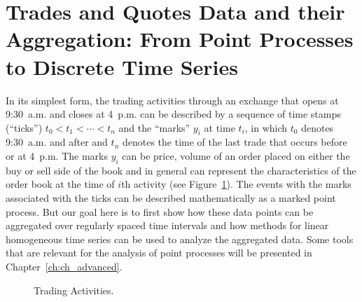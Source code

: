 \section{Trades and Quotes Data and their Aggregation: From Point Processes to Discrete Time Series\label{sec:tradesandquotes}}

In its simplest form, the trading activities through an exchange that opens at 9:30~a.m. and closes at 4~p.m. can be described by a sequence of time stamps (``ticks'') $t_0 < t_1 < \cdots < t_n$ and the ``marks'' $y_i$ at time $t_i$, in which $t_0$ denotes 9:30~a.m. and after and $t_n$ denotes the time of the last trade that occurs before or at 4~p.m. The marks $y_i$ can be price, volume of an order placed on either the buy or sell side of the book and in general can represent the characteristics of the order book at the time of $i$th activity (see Figure~\ref{fig:tradeactline}). The events with the marks associated with the ticks can be described mathematically as a marked point process. But our goal here is to first show how these data points can be aggregated over regularly spaced time intervals and how methods for linear homogeneous time series can be used to analyze the aggregated data. Some tools that are relevant for the analysis of point processes will be presented in Chapter~\ref{ch:ch_advanced}. \label{in:disc_time_unit1} \label{in:level3dat2}
	\begin{figure}[!ht]
	\centering
	\caption{Trading Activities. \label{fig:tradeactline}}
	\end{figure}


